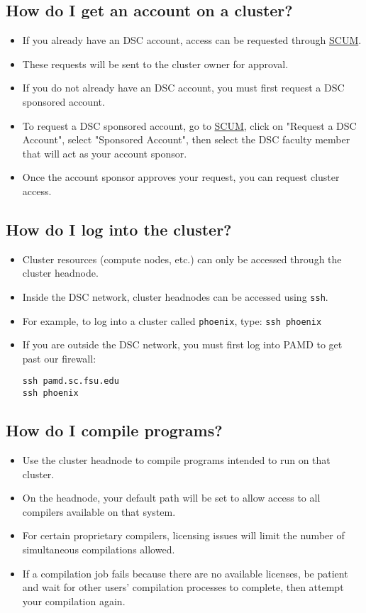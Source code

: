 \documentclass[12pt,a4paper]{article}
\begin{document}
\subsection*{How do I get an account on a cluster?}
\begin{itemize}
    \item If you already have an DSC account, access can be requested through \href{https://sc.fsu.edu/members/profile}{SCUM}.
    \item These requests will be sent to the cluster owner for approval.
    \item If you do not already have an DSC account, you must first request a DSC sponsored account.
    \item To request a DSC sponsored account, go to \href{https://sc.fsu.edu/members/profile}{SCUM}, click on "Request a DSC Account", select "Sponsored Account", then select the DSC faculty member that will act as your account sponsor.
    \item Once the account sponsor approves your request, you can request cluster access.
\end{itemize}

\subsection*{How do I log into the cluster?}
\begin{itemize}
    \item Cluster resources (compute nodes, etc.) can only be accessed through the cluster headnode.
    \item Inside the DSC network, cluster headnodes can be accessed using \texttt{ssh}.
    \item For example, to log into a cluster called \texttt{phoenix}, type: \texttt{ssh phoenix}
    \item If you are outside the DSC network, you must first log into PAMD to get past our firewall:
    \begin{verbatim}
ssh pamd.sc.fsu.edu
ssh phoenix
    \end{verbatim}
\end{itemize}

\subsection*{How do I compile programs?}
\begin{itemize}
    \item Use the cluster headnode to compile programs intended to run on that cluster.
    \item On the headnode, your default path will be set to allow access to all compilers available on that system.
    \item For certain proprietary compilers, licensing issues will limit the number of simultaneous compilations allowed.
    \item If a compilation job fails because there are no available licenses, be patient and wait for other users' compilation processes to complete, then attempt your compilation again.
\end{itemize}
\end{document}

